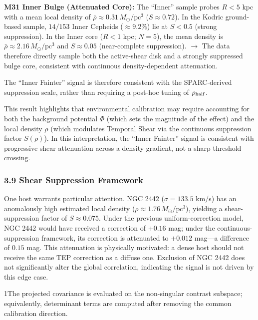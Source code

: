 \documentclass[
]{article}
\begin{document}
\textbf{M31 Inner Bulge (Attenuated Core):} The ``Inner'' sample probes
\(R < 5\) kpc with a mean local density of
\(\bar{\rho} \approx 0.31\,M_\odot/\text{pc}^3\) (\(S \approx
0.72\)). In the Kodric ground-based sample, \(14/153\) Inner Cepheids
(\(\approx 9.2\%\)) lie at \(S < 0.5\) (strong suppression). In the
Inner core (\(R<1\) kpc; \(N=5\)), the mean density is
\(\bar{\rho}\approx 2.16\,M_\odot/\text{pc}^3\) and \(S
\approx 0.05\) (near-complete suppression). \(\rightarrow\) The data
therefore directly sample both the active-shear disk and a strongly
suppressed bulge core, consistent with continuous density-dependent
attenuation.

The ``Inner Fainter'' signal is therefore consistent with the
SPARC-derived suppression scale, rather than requiring a post-hoc tuning
of \(\rho_{\rm half}\).

This result highlights that environmental calibration may require
accounting for both the background potential \(\Phi\) (which sets the
magnitude of the effect) and the local density \(\rho\) (which modulates
Temporal Shear via the continuous suppression factor \(S(\rho)\)). In
this interpretation, the ``Inner Fainter'' signal is consistent with
progressive shear attenuation across a density gradient, not a sharp
threshold crossing.

\subsubsection{3.9 Shear Suppression
Framework}\label{shear-suppression-framework}

One host warrants particular attention. NGC 2442 (\(\sigma = 133.5\)
km/s) has an anomalously high estimated local density
(\(\rho \approx 1.76 \,
M_\odot/\text{pc}^3\)), yielding a shear-suppression factor of
\(S \approx
0.075\). Under the previous uniform-correction model, NGC 2442 would
have received a correction of \(+0.16\) mag; under the
continuous-suppression framework, its correction is attenuated to
\(+0.012\) mag---a difference of \(0.15\) mag. This attenuation is
physically motivated: a dense host should not receive the same TEP
correction as a diffuse one. Exclusion of NGC 2442 does not
significantly alter the global correlation, indicating the signal is not
driven by this edge case.

1The projected covariance is evaluated on the non-singular contrast
subspace; equivalently, determinant terms are computed after removing
the common calibration direction.
\end{document}
